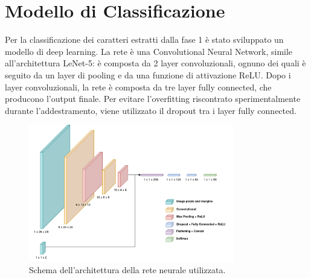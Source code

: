 \chapter{Modello di Classificazione}

Per la classificazione dei caratteri estratti dalla fase 1 è stato sviluppato un modello di deep learning. La rete è una Convolutional Neural Network, simile all'architettura LeNet-5: è composta da 2 layer convoluzionali, ognuno dei quali è seguito da un layer di pooling e da una funzione di attivazione ReLU. Dopo i layer convoluzionali, la rete è composta da tre layer fully connected, che producono l'output finale. Per evitare l'overfitting riscontrato sperimentalmente durante l'addestramento, viene utilizzato il dropout tra i layer fully connected.

\begin{figure}[H]
	\centering
	\includegraphics[width=0.8\textwidth]{assets/network.jpg}
	\caption{Schema dell'architettura della rete neurale utilizzata.}
	\label{fig:modello-schema}
\end{figure}

